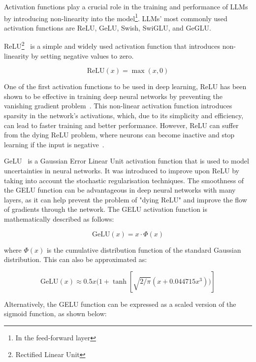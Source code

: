 Activation functions play a crucial role in the training and performance of LLMs by introducing non-linearity into the model\footnote{In the feed-forward layer}.
LLMs' most commonly used activation functions are ReLU, GeLU, Swish, SwiGLU, and GeGLU\@.

ReLU\footnote{Rectified Linear Unit}~\cite{nair2010rectified} is a simple and widely used activation function that introduces non-linearity by setting negative values to zero.

\begin{equation}
	\text{ReLU}(x) = \max(x, 0)
	\label{eq:relu}
\end{equation}

One of the first activation functions to be used in deep learning, ReLU has been shown to be effective in training deep neural networks by preventing the vanishing gradient problem~\cite{glorot2011deep}.
This non-linear activation function introduces sparsity in the network's activations, which, due to its simplicity and efficiency, can lead to faster training and better performance.
However, ReLU can suffer from the dying ReLU problem, where neurons can become inactive and stop learning if the input is negative~\cite{maas2013rectifier}.

GeLU~\cite{hendrycks2016gaussian} is a Gaussian Error Linear Unit activation function that is used to model uncertainties in neural networks.
It was introduced to improve upon ReLU by taking into account the stochastic regularisation techniques.
The smoothness of the GELU function can be advantageous in deep neural networks with many layers, as it can help prevent the problem of "dying ReLU" and improve the flow of gradients through the network.
The GELU activation function is mathematically described as follows:

\begin{equation}
	\text{GeLU}(x) = x \cdot \Phi(x)
	\label{eq:geluf}
\end{equation}

\noindent where \(\Phi(x)\) is the cumulative distribution function of the standard Gaussian distribution.
This can also be approximated as:

\begin{equation}
	\text{GeLU}(x) \approx 0.5x(1 + \tanh[\sqrt{2/\pi}(x + 0.044715x^3))]
	\label{eq:geluapprox1}
\end{equation}

Alternatively, the GELU function can be expressed as a scaled version of the sigmoid function, as shown below:

